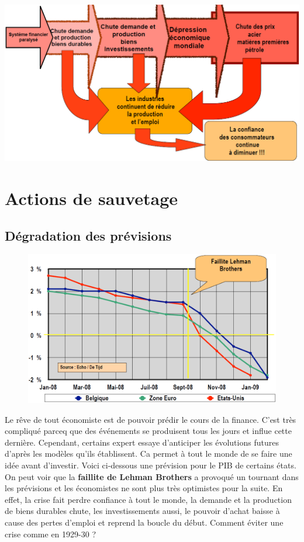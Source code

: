 \begin{center}
\includegraphics[scale=0.4]{22}
\end{center}

\section{Actions de sauvetage}
\subsection{Dégradation des prévisions}
\begin{figure}
\includegraphics[scale=0.35]{23}
\end{figure}
Le rêve de tout économiste est de pouvoir prédir le cours de la finance. C'est très compliqué parceq que des événements se produisent tous les jours et influe cette dernière. Cependant, certains expert essaye d'anticiper les évolutions futures d'après les modèles qu'ils établissent. Ca permet à tout le monde de se faire une idée avant d'investir. Voici ci-dessous une prévision pour le PIB de certains états. On peut voir que la \textbf{faillite de Lehman Brothers} a provoqué un tournant dans les prévisions et les économistes ne sont plus très optimistes pour la suite. En effet, la crise fait perdre confiance à tout le monde, la demande et la production de biens durables chute, les investissements aussi, le pouvoir d'achat baisse à cause des pertes d'emploi et reprend la boucle du début. Comment éviter une crise comme en 1929-30 ?

